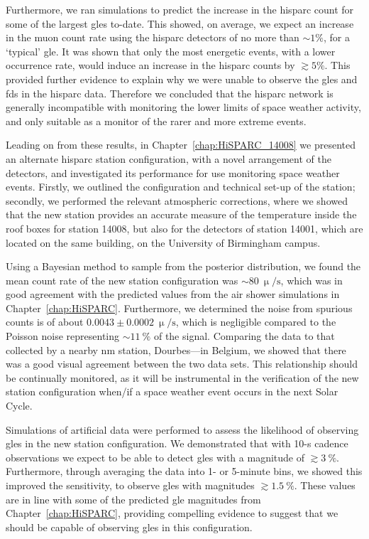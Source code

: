 Furthermore, we ran simulations to predict the increase in the \gls{hisparc} count for some of the largest \glspl{gle} to-date. This showed, on average, we expect an increase in the muon count rate using the \gls{hisparc} detectors of no more than $\sim 1\%$, for a `typical' \gls{gle}. It was shown that only the most energetic events, with a lower occurrence rate, would induce an increase in the \gls{hisparc} counts by $\gtrsim5\%$. This provided further evidence to explain why we were unable to observe the \glspl{gle} and \glspl{fd} in the \gls{hisparc} data. Therefore we concluded that the \gls{hisparc} network is generally incompatible with monitoring the lower limits of space weather activity, and only suitable as a monitor of the rarer and more extreme events.


Leading on from these results, in Chapter~\ref{chap:HiSPARC_14008} we presented an alternate \gls{hisparc} station configuration, with a novel arrangement of the detectors, and investigated its performance for use monitoring space weather events. Firstly, we outlined the configuration and technical set-up of the station; secondly, we performed the relevant atmospheric corrections, where we showed that the new station provides an accurate measure of the temperature inside the roof boxes for station 14008, but also for the detectors of station 14001, which are located on the same building, on the University of Birmingham campus.

Using a Bayesian method to sample from the posterior distribution, we found the mean count rate of the new station configuration was $\sim80~\upmu/\mathrm{s}$, which was in good agreement with the predicted values from the air shower simulations in Chapter~\ref{chap:HiSPARC}. Furthermore, we determined the noise from spurious counts is of about $0.0043\pm0.0002~\upmu/\mathrm{s}$, which is negligible compared to the Poisson noise representing $\sim11~\%$ of the signal. Comparing the data to that collected by a nearby \gls{nm} station, Dourbes---in Belgium, we showed that there was a good visual agreement between the two data sets. This relationship should be continually monitored, as it will be instrumental in the verification of the new station configuration when/if a space weather event occurs in the next Solar Cycle.

Simulations of artificial data were performed to assess the likelihood of observing \glspl{gle} in the new station configuration. We demonstrated that with 10-s cadence observations we expect to be able to detect \glspl{gle} with a magnitude of $\gtrsim3~\%$. Furthermore, through averaging the data into 1- or 5-minute bins, we showed this improved the sensitivity, to observe \glspl{gle} with magnitudes $\gtrsim1.5~\%$. These values are in line with some of the predicted \gls{gle} magnitudes from Chapter~\ref{chap:HiSPARC}, providing compelling evidence to suggest that we should be capable of observing \glspl{gle} in this configuration.

